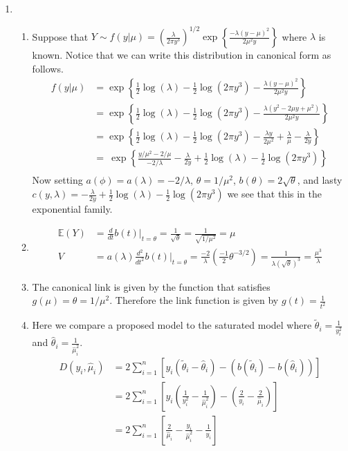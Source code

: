\documentclass[12pt]{article}  %
\newcommand{\E}{{\mathbb{E}}}
\begin{document}
\begin{enumerate}
\item 

\begin{enumerate}
\item Suppose that $Y \sim f(y|\mu) = \left(\frac{\lambda}{2\pi y^3}\right)^{1/2}\exp\left\{\frac{-\lambda(y-\mu)^2}{2\mu^2 y}\right\}$ where $\lambda$ is known. Notice that we can write this distribution in canonical form as follows. 
\begin{align*}
f(y|\mu) &= \exp\left\{\frac{1}{2}\log(\lambda)-\frac{1}{2}\log(2\pi y^3) - \frac{\lambda(y-\mu)^2}{2\mu^2 y}\right\}\\
&= \exp\left\{\frac{1}{2}\log(\lambda)-\frac{1}{2}\log(2\pi y^3) - \frac{\lambda(y^2-2\mu y + \mu^2)}{2\mu^2 y}\right\}\\
&=\exp\left\{\frac{1}{2}\log(\lambda)-\frac{1}{2}\log(2\pi y^3) - \frac{\lambda y}{2\mu^2} + \frac{\lambda}{\mu} - \frac{\lambda}{2y}\right\}\\
&= \ \exp\left\{\frac{y/\mu^2 - 2/\mu}{-2/\lambda} -\frac{\lambda}{2y} + \frac{1}{2}\log(\lambda) - \frac{1}{2}\log(2\pi y^3)\right\}\\
\end{align*}
Now setting $a(\phi) = a(\lambda) = -2/\lambda$, $\theta = 1/\mu^2$, $b(\theta) = 2\sqrt{\theta}$, and lasty $c(y,\lambda) = -\frac{\lambda}{2y} + \frac{1}{2}\log(\lambda) - \frac{1}{2}\log(2\pi y^3)$ we see that this in the exponential family. 

\item 
\begin{align*}
\E(Y) &= \frac{d}{dt}b(t)\Big|_{t=\theta} = \frac{1}{\sqrt{\theta}} = \frac{1}{\sqrt{1/\mu^2}} = \mu\\
V &= a(\lambda)\frac{d^2}{dt^2}b(t)\Big|_{t=\theta} = \frac{-2}{\lambda}\left(\frac{-1}{2}\theta^{-3/2}\right) = \frac{1}{\lambda(\sqrt{\theta})^3} = \frac{\mu^3}{\lambda}
\end{align*}
\item The canonical link is given by the function that satisfies $g(\mu) = \theta = 1/\mu^2$. Therefore the link function is given by $g(t) = \frac{1}{t^2}$ 

\item Here we compare a proposed model to the saturated model where $\tilde{\theta}_i = \frac{1}{y_i^2}$ and $\hat{\theta}_i = \frac{1}{\hat{\mu}_i^2}$. 
\begin{align*}
D(y_i, \hat{\mu}_i) &= 2\sum_{i=1}^n \left[y_i(\tilde{\theta}_i - \hat{\theta}_i) - (b(\tilde{\theta}_i)-b(\hat{\theta}_i))\right]\\
&= 2\sum_{i=1}^n \left[y_i(\frac{1}{y_i^2} - \frac{1}{\hat{\mu}_i^2}) - (\frac{2}{y_i} - \frac{2}{\hat{\mu}_i})\right]\\
&= 2\sum_{i=1}^n\left[\frac{2}{\hat{\mu}_i} - \frac{y_i}{\hat{\mu}_i^2} - \frac{1}{y_i}\right]
\end{align*}
\end{enumerate}


\end{enumerate}
\end{document}

